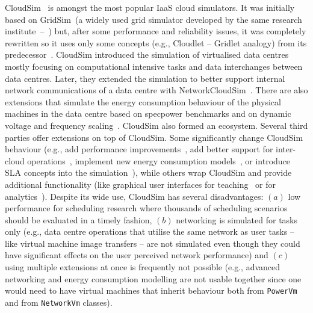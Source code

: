 \documentclass[sort, compress, 5p]{elsarticle}
\begin{document}
CloudSim~\cite{CloudSim-buyya2009modeling} is amongst the most popular IaaS cloud simulators. It was initially based on GridSim~(a widely used grid simulator developed by the same research institute~--~\cite{GridSIM-buyya2002gridsim}) but, after some performance and reliability issues, it was completely rewritten so it uses only some concepts (e.g., Cloudlet -- Gridlet analogy) from its predecessor~\cite{CloudSim-calheiros2011CloudSim}. CloudSim introduced the simulation of virtualised data centres mostly focusing on computational intensive tasks and data interchanges between data centres. Later, they extended the simulation to better support internal network communications of a data centre with NetworkCloudSim~\cite{CloudSim-garg2011networkCloudSim}. There are also extensions that simulate the energy consumption behaviour of the physical machines in the data centre based on specpower benchmarks and on dynamic voltage and frequency scaling~\cite{CloudSim-beloglazov2012optimal, CloudSimExt-DVFS}. CloudSim also formed an ecosystem. Several third parties offer extensions on top of CloudSim. Some significantly change CloudSim behaviour (e.g., add performance improvements~\cite{CloudSimExt-li2012dartcsim}, add better support for inter-cloud operations~\cite{SIMIC-6531742, SIMIC-6550488}, implement new energy consumption models~\cite{CloudSimExt-shi2011energy}, or introduce SLA concepts into the simulation~\cite{CloudSimExt-SLA}), while others wrap CloudSim and provide additional functionality (like graphical user interfaces for teaching~\cite{CloudSimExt-jararweh2012teachcloud} or for analytics~\cite{CloudSimExt-wickremasinghe2010cloudanalyst,CloudSimExt-CloudReports}). Despite its wide use, CloudSim has several disadvantages: $(a)$ low performance for scheduling research where thousands of scheduling scenarios should be evaluated in a timely fashion, $(b)$ networking is simulated for tasks only (e.g., data centre operations that utilise the same network as user tasks -- like virtual machine image transfers -- are not simulated even though they could have significant effects on the user perceived network performance) and $(c)$ using multiple extensions at once is frequently not possible (e.g., advanced networking and energy consumption modelling are not usable together since one would need to have virtual machines that inherit behaviour both from \verb+PowerVm+ and from \verb+NetworkVm+ classes).
\end{document}
